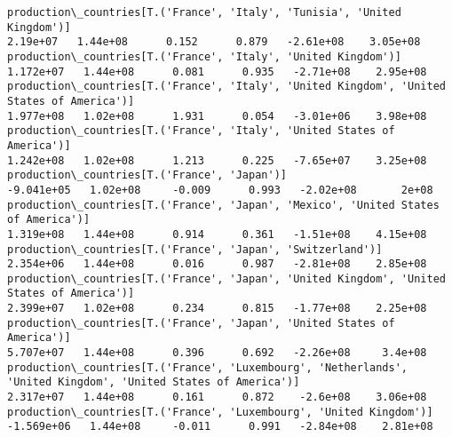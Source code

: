 \documentclass[11pt]{article}
\begin{document}
\begin{Verbatim}[commandchars=\\\{\}]
production\_countries[T.('France', 'Italy', 'Tunisia', 'United Kingdom')]                                                                                                                2.19e+07   1.44e+08      0.152      0.879   -2.61e+08    3.05e+08
production\_countries[T.('France', 'Italy', 'United Kingdom')]                                                                                                                          1.172e+07   1.44e+08      0.081      0.935   -2.71e+08    2.95e+08
production\_countries[T.('France', 'Italy', 'United Kingdom', 'United States of America')]                                                                                              1.977e+08   1.02e+08      1.931      0.054   -3.01e+06    3.98e+08
production\_countries[T.('France', 'Italy', 'United States of America')]                                                                                                                1.242e+08   1.02e+08      1.213      0.225   -7.65e+07    3.25e+08
production\_countries[T.('France', 'Japan')]                                                                                                                                           -9.041e+05   1.02e+08     -0.009      0.993   -2.02e+08       2e+08
production\_countries[T.('France', 'Japan', 'Mexico', 'United States of America')]                                                                                                      1.319e+08   1.44e+08      0.914      0.361   -1.51e+08    4.15e+08
production\_countries[T.('France', 'Japan', 'Switzerland')]                                                                                                                             2.354e+06   1.44e+08      0.016      0.987   -2.81e+08    2.85e+08
production\_countries[T.('France', 'Japan', 'United Kingdom', 'United States of America')]                                                                                              2.399e+07   1.02e+08      0.234      0.815   -1.77e+08    2.25e+08
production\_countries[T.('France', 'Japan', 'United States of America')]                                                                                                                5.707e+07   1.44e+08      0.396      0.692   -2.26e+08     3.4e+08
production\_countries[T.('France', 'Luxembourg', 'Netherlands', 'United Kingdom', 'United States of America')]                                                                          2.317e+07   1.44e+08      0.161      0.872    -2.6e+08    3.06e+08
production\_countries[T.('France', 'Luxembourg', 'United Kingdom')]                                                                                                                    -1.569e+06   1.44e+08     -0.011      0.991   -2.84e+08    2.81e+08

\end{Verbatim}
\end{document}
